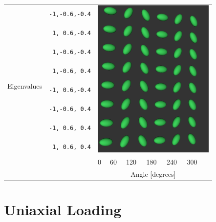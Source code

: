 \documentclass{InsightArticle}
\begin{document}
\begin{table}[ht]
  \begin{tabular}{cc p{0.01cm}p{0.4cm}p{0.5cm}p{0.5cm}p{0.5cm}p{0.5cm}p{0.5cm}}
    \hline
    \multirow{9}{*}{Eigenvalues}
    &\texttt{-1,-0.6,-0.4}&\multicolumn{7}{l}{\multirow{8}{*}{\includegraphics[width=6cm]{TensorGlyphMatrix}}} \\
    &\texttt{ 1, 0.6,-0.4}& & & & & & & \\
    &\texttt{ 1,-0.6,-0.4}& & & & & & & \\
    &\texttt{ 1,-0.6, 0.4}& & & & & & & \\
    &\texttt{-1, 0.6,-0.4}& & & & & & & \\
    &\texttt{-1,-0.6, 0.4}& & & & & & & \\
    &\texttt{-1, 0.6, 0.4}& & & & & & & \\
    &\texttt{ 1, 0.6, 0.4}& & & & & & & \\
    \hline
    \multicolumn{2}{c}{}& & 0 & 60 & 120 & 180 & 240 & 300 \\ [-1.1em]
    \multicolumn{2}{c}{}& \multicolumn{7}{c}{Angle [degrees]} \\
    \cline{3-9}
  \end{tabular}
  \label{tab:unsigned-flavors}
\end{table}


\section{Uniaxial Loading}
\end{document}

